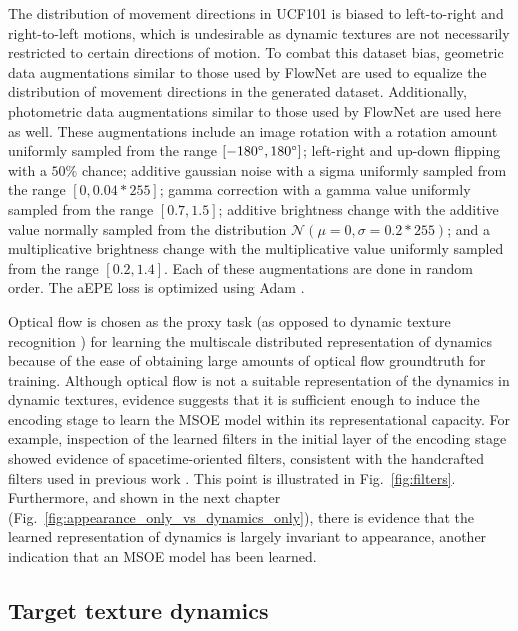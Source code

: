 {The distribution of movement directions in UCF101 is biased to left-to-right and right-to-left motions, which is undesirable as dynamic textures are not necessarily restricted to certain directions of motion. To combat this dataset bias, geometric data augmentations similar to those used by FlowNet \cite{dosovitskiy2015} are used to equalize the distribution of movement directions in the generated dataset. Additionally, photometric data augmentations similar to those used by FlowNet \cite{dosovitskiy2015} are used here as well. These augmentations include an image rotation with a rotation amount uniformly sampled from the range $[-180 \degree , 180 \degree]$; left-right and up-down flipping with a $50\%$ chance; additive gaussian noise with a sigma uniformly sampled from the range $[0, 0.04*255]$; gamma correction with a gamma value uniformly sampled from the range $[0.7, 1.5]$; additive brightness change with the additive value normally sampled from the distribution $\mathcal{N}(\mu = 0, \sigma = 0.2*255)$; and a multiplicative brightness change with the multiplicative value uniformly sampled from the range $[0.2, 1.4]$. Each of these augmentations are done in random order.
The aEPE loss is optimized using Adam \cite{kingma2017}.

Optical flow is chosen as the proxy task (as opposed to dynamic texture recognition \cite{derpanis2012spacetime}) for learning the multiscale distributed representation of dynamics because of the ease of obtaining large amounts of optical flow groundtruth for training. Although optical flow is not a suitable representation of the dynamics in dynamic textures, evidence suggests that it is sufficient enough to induce the encoding stage to learn the MSOE model within its representational capacity.
For example, inspection of the learned filters in the initial layer of the encoding stage
showed evidence of spacetime-oriented filters, consistent with
the handcrafted filters used in previous work \cite{derpanis2012spacetime}. This point is illustrated in Fig.\ \ref{fig:filters}. Furthermore, and shown in the next chapter (Fig.\ \ref{fig:appearance_only_vs_dynamics_only}), there is evidence that the learned representation of dynamics is largely invariant to appearance, another indication that an MSOE model has been learned.



\subsection{Target texture dynamics}

}
